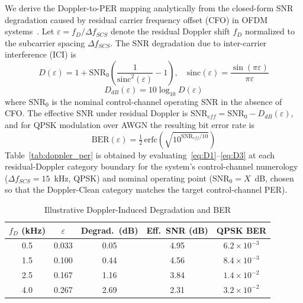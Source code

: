 \documentclass[conference]{IEEEtran}
\begin{document}
We derive the Doppler-to-PER mapping analytically from the closed-form SNR
degradation caused by residual carrier frequency offset (CFO) in OFDM
systems~\cite{pollet1995}. Let $\varepsilon = f_D / \Delta f_{SCS}$ denote
the residual Doppler shift $f_D$ normalized to the subcarrier spacing
$\Delta f_{SCS}$. The SNR degradation due to inter-carrier interference
(ICI) is
\begin{equation}
D(\varepsilon) = 1 + \mathrm{SNR}_0\left(\frac{1}{\mathrm{sinc}^2(\varepsilon)} - 1\right), \quad \mathrm{sinc}(\varepsilon) = \frac{\sin(\pi\varepsilon)}{\pi\varepsilon}
\label{eq:D1}
\end{equation}
\begin{equation}
D_{dB}(\varepsilon) = 10\log_{10} D(\varepsilon)
\label{eq:D2}
\end{equation}
where $\mathrm{SNR}_0$ is the nominal control-channel operating SNR in the
absence of CFO. The effective SNR under residual Doppler is
$\mathrm{SNR}_{eff} = \mathrm{SNR}_0 - D_{dB}(\varepsilon)$, and for QPSK
modulation over AWGN the resulting bit error rate is
\begin{equation}
\mathrm{BER}(\varepsilon) = \tfrac{1}{2}\,\mathrm{erfc}\!\left(\sqrt{10^{\mathrm{SNR}_{eff}/10}}\right)
\label{eq:D3}
\end{equation}
Table~\ref{tab:doppler_per} is obtained by evaluating~\eqref{eq:D1}--\eqref{eq:D3}
at each residual-Doppler category boundary for the system's control-channel
numerology ($\Delta f_{SCS} = 15$~kHz, QPSK) and nominal operating point
($\mathrm{SNR}_0 = X$~dB, chosen so that the Doppler-Clean category matches
the target control-channel PER). %

\begin{table}[h!]
    \centering
    \caption{Illustrative Doppler-Induced Degradation and BER}
    \label{tab:doppler_per_map}
    \begin{tabular}{|c|c|c|c|c|}
        \hline
        \textbf{$f_D$ (kHz)} & \textbf{$\varepsilon$} & \textbf{Degrad.\ (dB)} & \textbf{Eff.\ SNR (dB)} & \textbf{QPSK BER} \\
\hline
0.5 & 0.033 & 0.05 & 4.95 & $6.2\times10^{-3}$ \\
\hline
1.5 & 0.100 & 0.44 & 4.56 & $8.4\times10^{-3}$ \\
\hline
2.5 & 0.167 & 1.16 & 3.84 & $1.4\times10^{-2}$ \\
\hline
4.0 & 0.267 & 2.69 & 2.31 & $3.2\times10^{-2}$ \\
\hline
\end{tabular}
\end{table}
\end{document}
